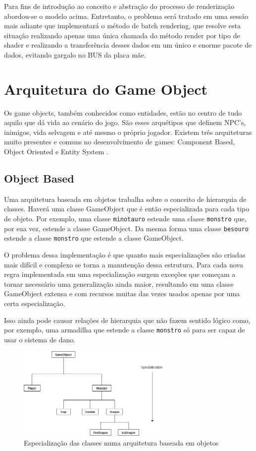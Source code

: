 \documentclass[12pt, 
openright, 
oneside, 
a4paper,    
brazil]{facom-ufu-abntex2}
\begin{document}
Para fins de introdução ao conceito e abstração do processo de renderização  abordou-se o modelo acima. Entretanto, o problema será tratado em uma sessão mais adiante que implementará o método de batch rendering, que resolve esta situação realizando apenas uma única chamada do método render por tipo de shader e realizando a transferência desses dados em um único e enorme pacote de dados, evitando gargalo no BUS da placa mãe.

\section{Arquitetura do Game Object}

Os game objects, também conhecidos como entidades, estão no centro de tudo aquilo que dá vida ao cenário do jogo. São esses arquétipos que definem NPC's, inimigos, vida selvagem e até mesmo o próprio jogador. Existem três arquiteturas muito presentes e comuns no desenvolvimento de games: Component Based, Object Oriented e Entity System \cite{GameObjectArchitecture}. 

\subsection{Object Based}
Uma arquitetura baseada em objetos trabalha sobre o conceito de hierarquia de classes. Haverá uma classe GameObject que é então especializada para cada tipo de objeto. Por exemplo, uma classe \texttt{minotauro} estende uma classe \texttt{monstro} que, por sua vez, estende a classe GameObject. Da mesma forma uma classe \texttt{besouro} estende a classe \texttt{monstro} que estende a classe GameObject.

O problema dessa implementação é que quanto mais especializações são criadas mais difícil e complexo se torna a manutenção dessa estrutura. Para cada nova regra implementada em uma especialização surgem exceções que começam a tornar necessário uma generalização ainda maior, resultando em uma classe GameObject extensa e com recursos muitas das vezes usados apenas por uma certa especialização.

Isso ainda pode causar relações de hierarquia que não fazem sentido lógico como, por exemplo, uma armadilha que estende a classe \texttt{monstro} só para ser capaz de usar o sistema de dano.


\begin{figure}[H]
	\centering
	\includegraphics[width=20em]{imagens/gameobject_specialization.png}
	\caption{Especialização das classes numa arquitetura baseada em objetos}
\end{figure}
\end{document}

